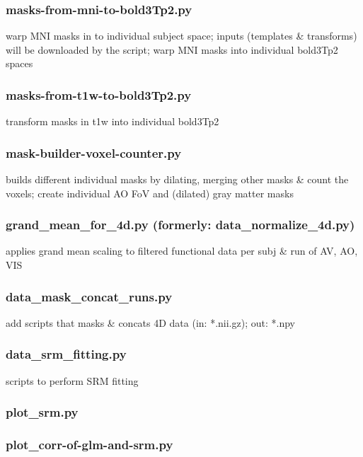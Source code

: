 \subsubsection{masks-from-mni-to-bold3Tp2.py}

warp MNI masks in to individual subject space; inputs (templates \& transforms)
will be downloaded by the script; warp MNI masks into individual bold3Tp2 spaces


\subsubsection{masks-from-t1w-to-bold3Tp2.py}
%
transform masks in t1w into individual bold3Tp2


\subsubsection{mask-builder-voxel-counter.py}

builds different individual masks by dilating, merging other masks \& count the
voxels; create individual AO FoV and (dilated) gray matter masks


\subsubsection{grand\_mean\_for\_4d.py (formerly: data\_normalize\_4d.py)}

applies grand mean scaling to filtered functional data per subj \& run of AV,
AO, VIS


\subsubsection{data\_mask\_concat\_runs.py}

add scripts that masks \& concats 4D data (in: *.nii.gz); out: *.npy


\subsubsection{data\_srm\_fitting.py}
%
scripts to perform SRM fitting


\subsubsection{plot\_srm.py}


\subsubsection{plot\_corr-of-glm-and-srm.py}


